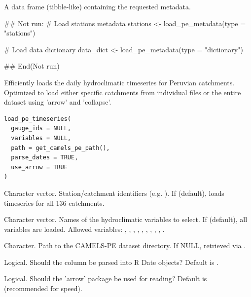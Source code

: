 \documentclass[a4paper]{book}
\begin{document}
%
\begin{Value}
A data frame (tibble-like) containing the requested metadata.
\end{Value}
%
\begin{Examples}
\begin{ExampleCode}
## Not run: 
# Load stations metadata
stations <- load_pe_metadata(type = "stations")

# Load data dictionary
data_dict <- load_pe_metadata(type = "dictionary")

## End(Not run)
\end{ExampleCode}
\end{Examples}
%
\begin{Description}
Efficiently loads the daily hydroclimatic timeseries for Peruvian catchments.
Optimized to load either specific catchments from individual files or the entire
dataset using 'arrow' and 'collapse'.
\end{Description}
%
\begin{Usage}
\begin{verbatim}
load_pe_timeseries(
  gauge_ids = NULL,
  variables = NULL,
  path = get_camels_pe_path(),
  parse_dates = TRUE,
  use_arrow = TRUE
)
\end{verbatim}
\end{Usage}
%
\begin{Arguments}
\begin{ldescription}
\item[\code{gauge\_ids}] Character vector. Station/catchment identifiers (e.g. ).
If  (default), loads timeseries for all 136 catchments.

\item[\code{variables}] Character vector. Names of the hydroclimatic variables to select.
If  (default), all variables are loaded. Allowed variables:
, , , , , ,
, , , .

\item[\code{path}] Character. Path to the CAMELS-PE dataset directory. If NULL,
retrieved via .

\item[\code{parse\_dates}] Logical. Should the  column be parsed into R Date objects?
Default is .

\item[\code{use\_arrow}] Logical. Should the 'arrow' package be used for reading?
Default is  (recommended for speed).
\end{ldescription}
\end{Arguments}
\end{document}
